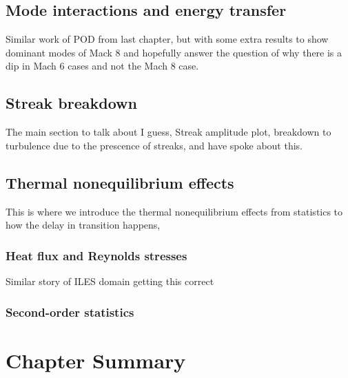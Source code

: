 \subsection{Mode interactions and energy transfer}

Similar work of POD from last chapter, but with some extra results to show dominant modes of Mack 8 and hopefully answer the question of why there is a dip in Mach 6 cases and not the Mach 8 case. 

\subsection{Streak breakdown}
The main section to talk about I guess, Streak amplitude plot, breakdown to turbulence due to the prescence of streaks, \citep{Andersson2001} and \citep{Passiatore2021} have spoke  about this. 


\subsection{Thermal nonequilibrium effects}
This is where we introduce the thermal nonequilibrium effects from statistics to how the delay in transition happens, 

\subsubsection{Heat flux and Reynolds stresses}
Similar story of ILES domain getting this correct

\subsubsection{Second-order statistics}


\section{Chapter Summary}


